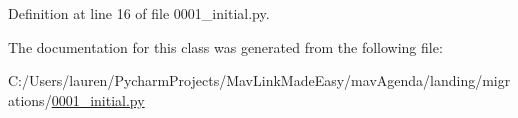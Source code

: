 Definition at line 16 of file 0001\+\_\+initial.\+py.



The documentation for this class was generated from the following file\+:\begin{DoxyCompactItemize}
\item 
C\+:/\+Users/lauren/\+Pycharm\+Projects/\+Mav\+Link\+Made\+Easy/mav\+Agenda/landing/migrations/\mbox{\hyperlink{0001__initial_8py}{0001\+\_\+initial.\+py}}\end{DoxyCompactItemize}

